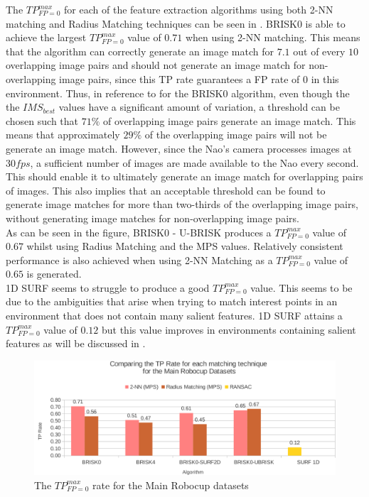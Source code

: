 The $TP_{FP=0}^{max}$ for each of the feature extraction algorithms using both 2-NN matching and Radius Matching techniques can be seen in . BRISK0 is able to achieve the largest $TP_{FP=0}^{max}$ value of $0.71$ when using 2-NN matching. This means that the algorithm can correctly generate an image match for $7.1$ out of every $10$ overlapping image pairs and should not generate an image match for non-overlapping image pairs, since this TP rate guarantees a FP rate of $0$ in this environment. Thus, in reference to  for the BRISK0 algorithm, even though the the $IMS_{best}$ values have a significant amount of variation, a threshold can be chosen such that $71\%$ of overlapping image pairs generate an image match. This means that approximately $29\%$ of the overlapping image pairs will not be generate an image match. However, since the Nao's camera processes images at $30 fps$, a sufficient number of images are made available to the Nao every second. This should enable it to ultimately generate an image match for overlapping pairs of images. This also implies that an acceptable threshold can be found to generate image matches for more than two-thirds of the overlapping image pairs, without generating image matches for non-overlapping image pairs.\\

As can be seen in the figure, BRISK0 - U-BRISK produces a $TP_{FP=0}^{max}$ value of $0.67$ whilst using Radius Matching and the MPS values. Relatively consistent performance is also achieved when using 2-NN Matching as a $TP_{FP=0}^{max}$ value of $0.65$ is generated.\\ 

1D SURF seems to struggle to produce a good $TP_{FP=0}^{max}$ value. This seems to be due to the ambiguities that arise when trying to match interest points in an environment that does not contain many salient features. 1D SURF attains a $TP_{FP=0}^{max}$ value of $0.12$ but this value improves in environments containing salient features as will be discussed in .\\

\begin{figure}
  \centering
    \includegraphics[width=1.0\textwidth]{../Drawings/Graphs/tp_rate_mrb.pdf}
    \caption{The $TP_{FP=0}^{max}$ rate for the Main Robocup datasets} 
    \label{fig:tp_rate_mrd}
\end{figure}

